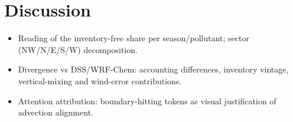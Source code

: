 \section{Discussion}
\begin{itemize}
  \item Reading of the inventory-free share per season/pollutant; sector (NW/N/E/S/W) decomposition.
  \item Divergence vs DSS/WRF-Chem: accounting differences, inventory vintage, vertical-mixing and wind-error contributions.
  \item Attention attribution: boundary-hitting tokens as visual justification of advection alignment.
\end{itemize}

